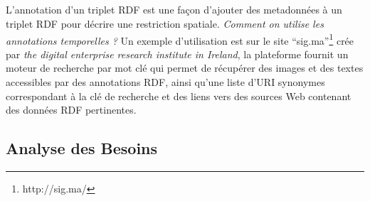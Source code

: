 \documentclass[12pt,a4	]{report}
\begin{document}
\subparagraph{}
L'annotation d'un triplet RDF est une façon d'ajouter des metadonnées à un triplet RDF pour décrire une restriction spatiale.
\newline
\textit{Comment on utilise les annotations temporelles ?} Un exemple d'utilisation est sur le site ``sig.ma''\footnote{http://sig.ma/} crée par \textit{the digital enterprise research institute in Ireland}, la plateforme fournit un moteur de recherche par mot clé qui permet de récupérer des images et des textes accessibles par des annotations RDF, ainsi qu'une liste d'URI synonymes correspondant à la clé de recherche et des liens vers des sources Web contenant des données RDF pertinentes.
\subsection*{Analyse des Besoins}
\end{document}
